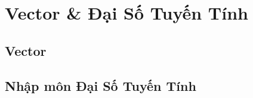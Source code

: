   
\chapter{Vector \& Đại Số Tuyến Tính}


\section{Vector}
 

\section{Nhập môn Đại Số Tuyến Tính}



\begin{refsection}
\nocite{linear123, extrabook}
\printbibliography
\end{refsection}